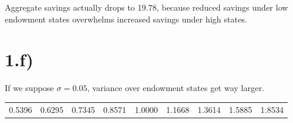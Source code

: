 \documentclass{article}
\begin{document}
Aggregate savings actually drops to 19.78, because reduced savings under low
endowment states overwhelms increased savings under high states.

\section*{1.f)}

If we suppose $\sigma=0.05$, variance over endowment states get way larger.

\begin{scriptsize}
\begin{tabular}{lllllllll}
   0.5396  &  0.6295  &  0.7345  &  0.8571   & 1.0000 &   1.1668   & 1.3614   & 1.5885  &  1.8534
\end{tabular}
\end{scriptsize}


\begin{figure}[p]
    \vspace*{-2cm}
\end{figure}
\end{document}
